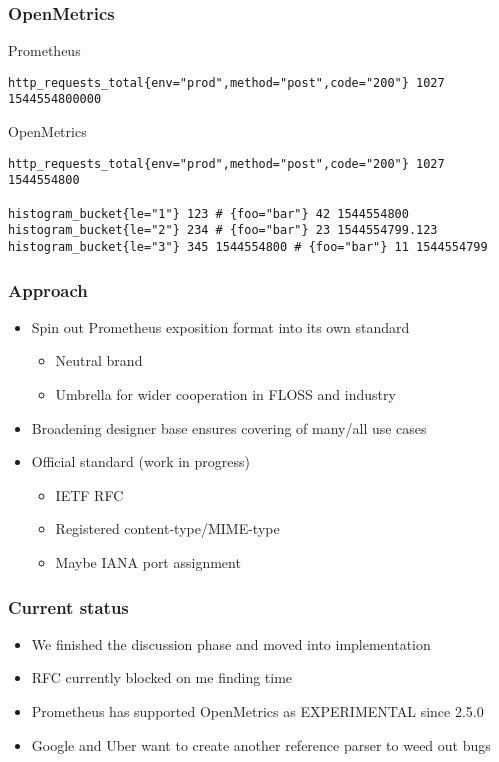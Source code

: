 \documentclass[aspectratio=169]{beamer}
\begin{document}
\begin{frame}[fragile]
        \frametitle{OpenMetrics}
        \fontsize{10pt}{12}\selectfont
Prometheus
        \begin{verbatim}
http_requests_total{env="prod",method="post",code="200"} 1027 1544554800000
        \end{verbatim}
OpenMetrics
        \begin{verbatim}
http_requests_total{env="prod",method="post",code="200"} 1027 1544554800

histogram_bucket{le="1"} 123 # {foo="bar"} 42 1544554800
histogram_bucket{le="2"} 234 # {foo="bar"} 23 1544554799.123
histogram_bucket{le="3"} 345 1544554800 # {foo="bar"} 11 1544554799
        \end{verbatim}
\end{frame}


\begin{frame}
	\frametitle{Approach}
	\vfill
	\begin{itemize}
		\item Spin out Prometheus exposition format into its own standard
		\begin{itemize}
			\item Neutral brand
			\item Umbrella for wider cooperation in FLOSS and industry
		\end{itemize}
		\item Broadening designer base ensures covering of many/all use cases
		\item Official standard (work in progress)
		\begin{itemize}
			\item IETF RFC
			\item Registered content-type/MIME-type
			\item Maybe IANA port assignment
		\end{itemize}
	\end{itemize}
	\vfill
\end{frame}

\begin{frame}
	\frametitle{Current status}
	\vfill
	\begin{itemize}
		\item We finished the discussion phase and moved into implementation
		\item RFC currently blocked on me finding time
		\item Prometheus has supported OpenMetrics as EXPERIMENTAL since 2.5.0
		\item Google and Uber want to create another reference parser to weed out bugs
	\end{itemize}
	\vfill
\end{frame}
\end{document}
